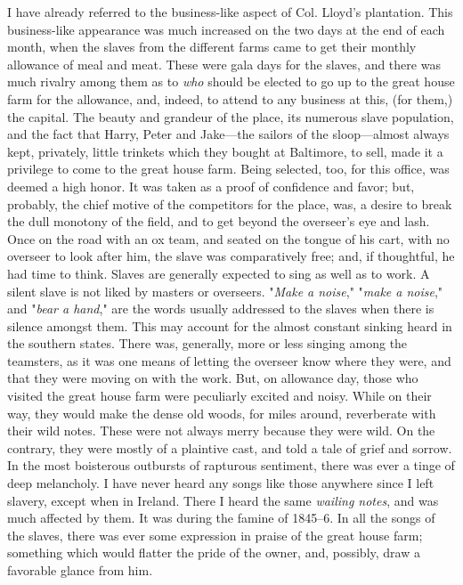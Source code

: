 I have already referred to the business-like aspect of Col. Lloyd's
plantation. This business-like appearance was much increased on the two
days at the end {\protect\hypertarget{97}{}{}}of each month, when the
slaves from the different farms came to get their monthly allowance of
meal and meat. These were gala days for the slaves, and there was much
rivalry among them as to \emph{who} should be elected to go up to the
great house farm for the allowance, and, indeed, to attend to any
business at this, (for them,) the capital. The beauty and grandeur of
the place, its numerous slave population, and the fact that Harry, Peter
and Jake---the sailors of the sloop---almost always kept, privately,
little trinkets which they bought at Baltimore, to sell, made it a
privilege to come to the great house farm. Being selected, too, for this
office, was deemed a high honor. It was taken as a proof of confidence
and favor; but, probably, the chief motive of the competitors for the
place, was, a desire to break the dull monotony of the field, and to get
beyond the overseer's eye and lash. Once on the road with an ox team,
and seated on the tongue of his cart, with no overseer to look after
him, the slave was comparatively free; and, if thoughtful, he had time
to think. Slaves are generally expected to sing as well as to work. A
silent slave is not liked by masters or overseers. "\emph{Make a
noise}," "\emph{make a noise}," and "\emph{bear a hand}," are the words
usually addressed to the slaves when there is silence amongst them. This
may account for the almost constant sinking heard in the southern
states. There was, generally, more or less singing among the teamsters,
as it was one means of letting the overseer know where they were, and
that they were moving on with the work. But, on allowance day, those who
visited the great house farm were peculiarly excited
{\protect\hypertarget{98}{}{}}and noisy. While on their way, they would
make the dense old woods, for miles around, reverberate with their wild
notes. These were not always merry because they were wild. On the
contrary, they were mostly of a plaintive cast, and told a tale of grief
and sorrow. In the most boisterous outbursts of rapturous sentiment,
there was ever a tinge of deep melancholy. I have never heard any songs
like those anywhere since I left slavery, except when in Ireland. There
I heard the same \emph{wailing notes}, and was much affected by them. It
was during the famine of 1845--6. In all the songs of the slaves, there
was ever some expression in praise of the great house farm; something
which would flatter the pride of the owner, and, possibly, draw a
favorable glance from him.

